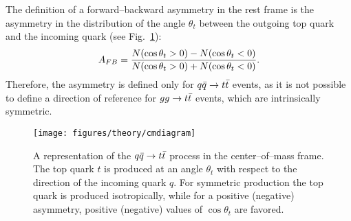 The definition of a forward--backward asymmetry in the
\ttbar{} rest frame is the asymmetry in the distribution of the angle
$\theta_t$ between the outgoing top quark and the incoming quark
(see Fig.~\ref{fig:cmdiagram}):
\begin{equation}
\label{eq:afbcostheta}
A_{FB}{}=\frac{N(\cos\theta_t>0)-N(\cos\theta_t<0)}{N(\cos\theta_t>0)+N(\cos\theta_t<0)}.
\end{equation}
Therefore, the asymmetry is defined only for \mbox{$q\bar{q}{}\to t\bar{t}{}$}
events, as it is not possible to define a direction of reference for
$gg\to t\bar{t}{}$ events, which are intrinsically symmetric.
\begin{figure}[!htb]\centering
  \texttt{[image: figures/theory/cmdiagram]}
  \caption{A representation of the $q\bar{q}{}\to t\bar{t}{}$ process in the
    center--of--mass frame. The top quark $t$ is produced at an angle
    $\theta_t$ with respect to the direction of the incoming quark
    $q$. For symmetric production the top quark is produced
    isotropically, while for a positive (negative) asymmetry, positive
    (negative) values of $\cos\theta_t$ are favored.} 
  \label{fig:cmdiagram}
\end{figure}

